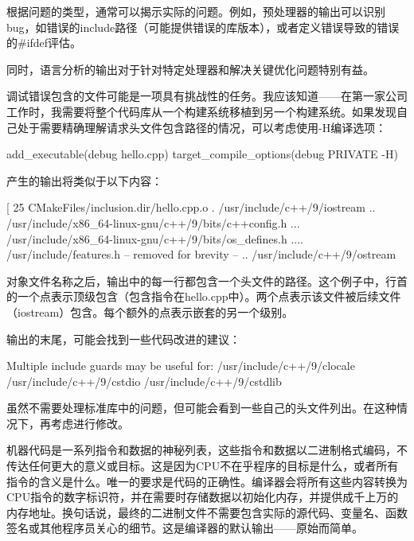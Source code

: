 根据问题的类型，通常可以揭示实际的问题。例如，预处理器的输出可以识别bug，如错误的include路径（可能提供错误的库版本），或者定义错误导致的错误的\#ifdef评估。

同时，语言分析的输出对于针对特定处理器和解决关键优化问题特别有益。


调试错误包含的文件可能是一项具有挑战性的任务。我应该知道——在第一家公司工作时，我需要将整个代码库从一个构建系统移植到另一个构建系统。如果发现自己处于需要精确理解请求头文件包含路径的情况，可以考虑使用-H编译选项：


\begin{cmake}
add_executable(debug hello.cpp)
target_compile_options(debug PRIVATE -H)
\end{cmake}

产生的输出将类似于以下内容：

\begin{shell}
[ 25%
  CMakeFiles/inclusion.dir/hello.cpp.o
. /usr/include/c++/9/iostream
.. /usr/include/x86_64-linux-gnu/c++/9/bits/c++config.h
... /usr/include/x86_64-linux-gnu/c++/9/bits/os_defines.h
.... /usr/include/features.h
-- removed for brevity --
.. /usr/include/c++/9/ostream
\end{shell}

对象文件名称之后，输出中的每一行都包含一个头文件的路径。这个例子中，行首的一个点表示顶级包含（包含指令在hello.cpp中）。两个点表示该文件被后续文件（iostream）包含。每个额外的点表示嵌套的另一个级别。

输出的末尾，可能会找到一些代码改进的建议：

\begin{shell}
Multiple include guards may be useful for:
/usr/include/c++/9/clocale
/usr/include/c++/9/cstdio
/usr/include/c++/9/cstdlib
\end{shell}

虽然不需要处理标准库中的问题，但可能会看到一些自己的头文件列出。在这种情况下，再考虑进行修改。


机器代码是一系列指令和数据的神秘列表，这些指令和数据以二进制格式编码，不传达任何更大的意义或目标。这是因为CPU不在乎程序的目标是什么，或者所有指令的含义是什么。唯一的要求是代码的正确性。编译器会将所有这些内容转换为CPU指令的数字标识符，并在需要时存储数据以初始化内存，并提供成千上万的内存地址。换句话说，最终的二进制文件不需要包含实际的源代码、变量名、函数签名或其他程序员关心的细节。这是编译器的默认输出——原始而简单。


